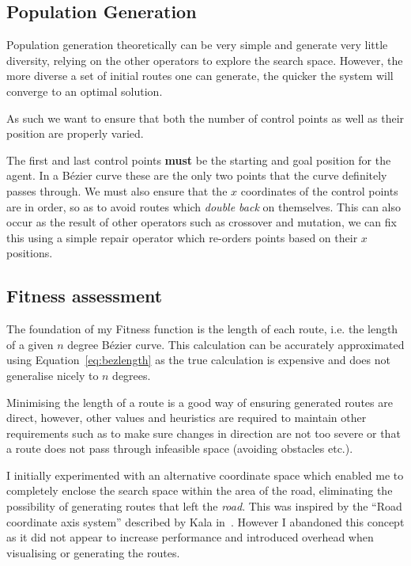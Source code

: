 \subsection{Population Generation}

Population generation theoretically can be very simple and generate very little diversity, relying on the other operators to explore the search space. However, the more diverse a set of initial routes one can generate, the quicker the system will converge to an optimal solution.

As such we want to ensure that both the number of control points as well as their position are properly varied.

The first and last control points \textbf{must} be the starting and goal position for the agent. In a Bézier curve these are the only two points that the curve definitely passes through. We must also ensure that the $x$ coordinates of the control points are in order, so as to avoid routes which \textit{double back} on themselves. This can also occur as the result of other operators such as crossover and mutation, we can fix this using a simple repair operator which re-orders points based on their $x$ positions.


\subsection{Fitness assessment}

The foundation of my Fitness function is the length of each route, i.e. the length of a given $n$ degree Bézier curve. This calculation can be accurately approximated using Equation~\ref{eq:bezlength} as the true calculation is expensive and does not generalise nicely to $n$ degrees\cite{gravesenAdaptiveSubdivisionLength1997}.

Minimising the length of a route is a good way of ensuring generated routes are direct, however, other values and heuristics are required to maintain other requirements such as to make sure changes in direction are not too severe or that a route does not pass through infeasible space (avoiding obstacles etc.).

I initially experimented with an alternative coordinate space which enabled me to completely enclose the search space within the area of the road, eliminating the possibility of generating routes that left the \textit{road}. This was inspired by the ``Road coordinate axis system'' described by Kala in~\cite{kalaOptimizationBasedPlanning2016}. However I abandoned this concept as it did not appear to increase performance and introduced overhead when visualising or generating the routes.

